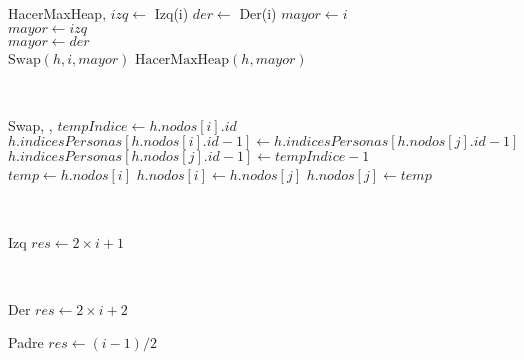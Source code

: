 \documentclass[../main.tex]{subfiles}
\begin{document}
\begin{algoritmos}
\begin{implementacion}{HacerMaxHeap}{, }{}{}
\State $izq \gets$ Izq(i) 
\State $der \gets$ Der(i) 
\State $mayor \gets i$ 
\\
 
    \State $mayor \gets izq$ 
\EndIf
\\
 
    \State $mayor \gets der$ 
\EndIf
\\
 
    \State $\text{Swap}(h, i, mayor)$ 
    \State $\text{HacerMaxHeap}(h, mayor)$ 
\EndIf

\\
\end{implementacion}

\begin{implementacion}{Swap}{, , }{}{}
\State $tempIndice \gets h.nodos[i].id$ 
\State $h.indicesPersonas[h.nodos[i].id - 1] \gets h.indicesPersonas[h.nodos[j].id - 1]$ 
\State $h.indicesPersonas[h.nodos[j].id - 1] \gets tempIndice - 1$ 
\\
\State $temp \gets h.nodos[i]$ 
\State $h.nodos[i] \gets h.nodos[j]$ 
\State $h.nodos[j] \gets temp$ 


\\
\end{implementacion}

\begin{implementacion}{Izq}{}{\nat}{}
\State $res \gets 2 \times i + 1$ 

\\
\end{implementacion}

\begin{implementacion}{Der}{}{\nat}{}
\State $res \gets 2 \times i + 2$ 
\\
\end{implementacion}

\begin{implementacion}{Padre}{}{\nat}{}
\State $res \gets (i - 1) / 2$ 

\\
\end{implementacion}
\end{algoritmos}
\end{document}
